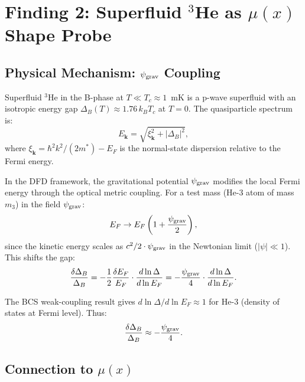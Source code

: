 \documentclass[11pt]{article}
\theoremstyle{definition}
\theoremstyle{remark}
\begin{document}
\section{Finding 2: Superfluid $^3$He as $\mu(x)$ Shape Probe}
\label{sec:he3_probe}

\subsection{Physical Mechanism: $\psi_{\rm grav}$ Coupling}

Superfluid $^3$He in the B-phase at $T \ll T_c \approx 1$~mK is a
p-wave superfluid with an isotropic energy gap
$\Delta_B(T) \approx 1.76\,k_B T_c$ at $T = 0$. The quasiparticle
spectrum is:
\begin{equation}
E_{\mathbf{k}} = \sqrt{\xi_{\mathbf{k}}^2 + |\Delta_B|^2},
\label{eq:he3_spectrum}
\end{equation}
where $\xi_{\mathbf{k}} = \hbar^2 k^2/(2m^*) - E_F$ is the normal-state
dispersion relative to the Fermi energy.

In the DFD framework, the gravitational potential $\psi_{\rm grav}$
modifies the local Fermi energy through the optical metric coupling.
For a test mass (He-3 atom of mass $m_3$) in the field $\psi_{\rm grav}$:
\begin{equation}
E_F \to E_F\left(1 + \frac{\psi_{\rm grav}}{2}\right),
\label{eq:ef_shift}
\end{equation}
since the kinetic energy scales as $c^2/2 \cdot \psi_{\rm grav}$
in the Newtonian limit ($|\psi| \ll 1$). This shifts the gap:
\begin{equation}
\frac{\delta\Delta_B}{\Delta_B} = -\frac{1}{2}\frac{\delta E_F}{E_F}
\cdot \frac{d\ln\Delta}{d\ln E_F}
= -\frac{\psi_{\rm grav}}{4}\cdot\frac{d\ln\Delta}{d\ln E_F}.
\label{eq:gap_shift}
\end{equation}

The BCS weak-coupling result gives $d\ln\Delta/d\ln E_F \approx 1$
for He-3 (density of states at Fermi level). Thus:
\begin{equation}
\frac{\delta\Delta_B}{\Delta_B} \approx -\frac{\psi_{\rm grav}}{4}.
\label{eq:gap_shift_simple}
\end{equation}

\subsection{Connection to $\mu(x)$}
\end{document}
